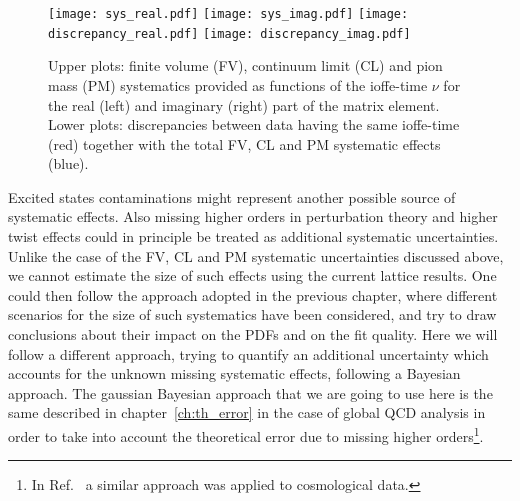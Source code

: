 \begin{figure}[h!]
    \centering
    \texttt{[image: sys\_real.pdf]}  
    \texttt{[image: sys\_imag.pdf]}
    \texttt{[image: discrepancy\_real.pdf]}  
    \texttt{[image: discrepancy\_imag.pdf]}
\caption{Upper plots: finite volume (FV), continuum limit (CL) and pion mass (PM) systematics provided 
as functions of the ioffe-time $\nu$ for the real (left) and imaginary (right) part 
of the matrix element. Lower plots: discrepancies between data having the same ioffe-time (red)
together with the total FV, CL and PM systematic effects (blue).}
\label{fig:sys}
\end{figure}

%
Excited states contaminations might represent another possible source of systematic effects. 
Also missing higher orders in perturbation theory and higher twist effects could in principle be treated
as additional systematic uncertainties. 
Unlike the case of the FV, CL and PM systematic uncertainties discussed above, we cannot estimate
the size of such effects using the current lattice results. 
One could then follow the approach adopted in the previous chapter,
where different scenarios for the size of such systematics have been considered, and try to draw conclusions about their
impact on the PDFs and on the fit quality. 
Here we will follow a different approach, trying to quantify an additional uncertainty which accounts for the 
unknown missing systematic effects, following a Bayesian approach.
The gaussian Bayesian approach that we are going to use here is the same 
described in chapter~\ref{ch:th_error} in the case of global QCD analysis in order to take into account 
the theoretical error due to missing higher orders\footnote{In Ref.~\cite{Bernal:2018cxc} a similar approach was applied 
to cosmological data.}.

